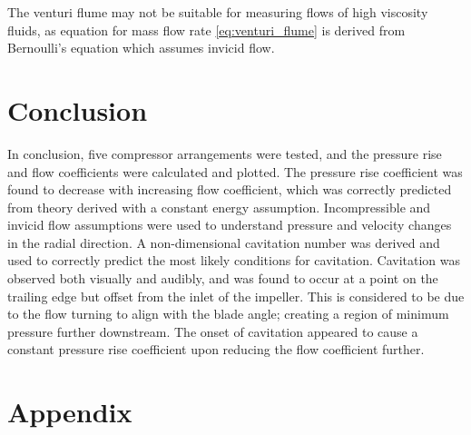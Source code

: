 \documentclass{article}
\begin{document}
The venturi flume may not be suitable for measuring flows of high viscosity fluids, as equation for mass flow rate \ref{eq:venturi_flume} 
is derived from Bernoulli's equation which assumes invicid flow.

\section{Conclusion}

In conclusion, five compressor arrangements were tested, and the pressure rise and flow coefficients were calculated and plotted.
The pressure rise coefficient was found to decrease with increasing flow coefficient, 
which was correctly predicted from theory derived with a constant energy assumption.
Incompressible and invicid flow assumptions were used to understand pressure and velocity changes in the radial direction.
A non-dimensional cavitation number was derived and used to correctly predict the most likely conditions for cavitation.
Cavitation was observed both visually and audibly, and was found to occur at a point on the trailing edge but offset from the inlet of the impeller.
This is considered to be due to the flow turning to align with the blade angle; creating a region of minimum pressure further downstream.
The onset of cavitation appeared to cause a constant pressure rise coefficient upon reducing the flow coefficient further.


\section{Appendix}
\end{document}
